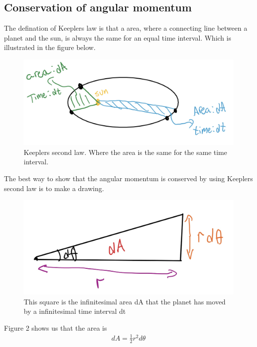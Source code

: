 \documentclass{article}
\begin{document}
\begin{multicols}{2}
\subsection{Conservation of angular momentum}
The defination of Keeplers law is that a area, where a connecting line between a planet and the sun, is always the same for an equal time interval. Which is illustrated in the figure below.
\begin{figure}[H]
	\centering
	\includegraphics[width=\linewidth]{K2L.jpg}
	\caption{Keeplers second law. Where the area is the same for the same time interval.}
	\label{fig:1bplot}
\end{figure}
The best way to show that the angular momentum is conserved by using Keeplers second law is to make a drawing.
\begin{figure}[H]
	\centering
	\includegraphics[width=\linewidth]{sketch.jpg}
	\caption{This square is the infinitesimal area dA that the planet has moved by a infinitesimal time interval dt}
	\label{fig:1bplot}
\end{figure}
Figure 2 shows us that the area is 
\begin{align}
    dA=\frac{1}{2}r^2d\theta
\end{align}



\end{multicols}
\end{document}
